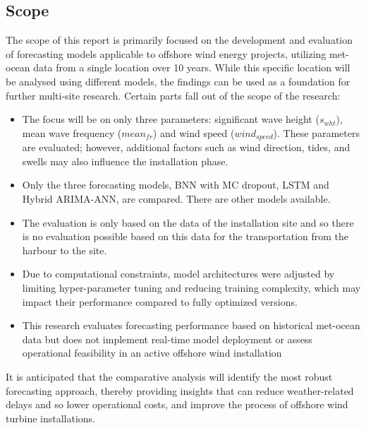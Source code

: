 \newpage 

\subsection*{Scope}
The scope of this report is primarily focused on the development and evaluation of forecasting models applicable to offshore wind energy projects, utilizing met-ocean data from a single location over 10 years. While this specific location will be analysed using different models, the findings can be used as a foundation for further multi-site research. Certain parts fall out of the scope of the research:

\begin{itemize}
    \item The focus will be on only three parameters: significant wave height ($s_{wht}$), mean wave frequency ($mean_{fr}$) and wind speed ($wind_{speed}$). These parameters are evaluated; however, additional factors such as wind direction, tides, and swells may also influence the installation phase. 
    \item Only the three forecasting models, BNN with MC dropout, LSTM and Hybrid ARIMA-ANN, are compared. There are other models available.
    \item The evaluation is only based on the data of the installation site and so there is no evaluation possible based on this data for the transportation from the harbour to the site.
    \item Due to computational constraints, model architectures were adjusted by limiting hyper-parameter tuning and reducing training complexity, which may impact their performance compared to fully optimized versions.
    \item This research evaluates forecasting performance based on historical met-ocean data but does not implement real-time model deployment or assess operational feasibility in an active offshore wind installation
\end{itemize}

It is anticipated that the comparative analysis will identify the most robust forecasting approach, thereby providing insights that can reduce weather-related delays and so lower operational costs, and improve the process of offshore wind turbine installations.
